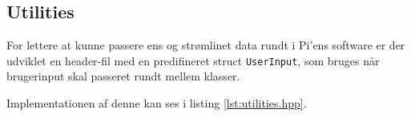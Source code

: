 \subsection{Utilities}\label{sec:utilities_bil}

For lettere at kunne passere ens og strømlinet data rundt i Pi'ens software er der udviklet en header-fil med en predifineret struct \texttt{UserInput}, som bruges når brugerinput skal passeret rundt mellem klasser.

Implementationen af denne kan ses i listing \ref{lst:utilities.hpp}.




